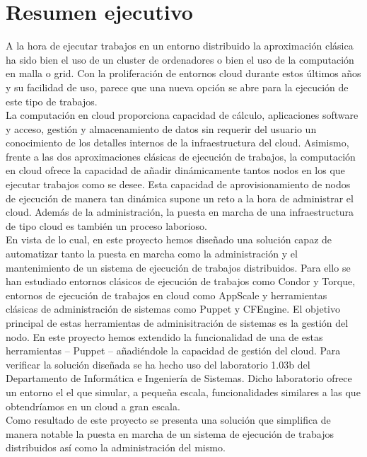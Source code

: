 \chapter{Resumen ejecutivo}
\label{cap:resumen}


A la hora de ejecutar trabajos en un entorno distribuido la aproximación clásica ha sido bien el uso de un cluster de ordenadores o bien el uso de la computación en malla o grid. Con la proliferación de entornos cloud durante estos últimos años y su facilidad de uso, parece que una nueva opción se abre para la ejecución de este tipo de trabajos.\\

La computación en cloud proporciona capacidad de cálculo, aplicaciones software y acceso, gestión y almacenamiento de datos sin requerir del usuario un conocimiento de los detalles internos de la infraestructura del cloud. Asimismo, frente a las dos aproximaciones clásicas de ejecución de trabajos, la computación en cloud ofrece la capacidad de añadir dinámicamente tantos nodos en los que ejecutar trabajos como se desee. Esta capacidad de aprovisionamiento de nodos de ejecución de manera tan dinámica supone un reto a la hora de administrar el cloud. Además de la administración, la puesta en marcha de una infraestructura de tipo cloud es también un proceso laborioso.\\

En vista de lo cual, en este proyecto hemos diseñado una solución capaz de automatizar tanto la puesta en marcha como la administración y el mantenimiento de un sistema de ejecución de trabajos distribuidos. Para ello se han estudiado entornos clásicos de ejecución de trabajos como Condor y Torque, entornos de ejecución de trabajos en cloud como AppScale y herramientas clásicas de administración de sistemas como Puppet y CFEngine. El objetivo principal de estas herramientas de adminisitración de sistemas es la gestión del nodo. En este proyecto hemos extendido la funcionalidad de una de estas herramientas -- Puppet -- añadiéndole la capacidad de gestión del cloud. Para verificar la solución diseñada se ha hecho uso del laboratorio 1.03b del Departamento de Informática e Ingeniería de Sistemas. Dicho laboratorio ofrece un entorno el el que simular, a pequeña escala, funcionalidades similares a las que obtendríamos en un cloud a gran escala.\\

Como resultado de este proyecto se presenta una solución que simplifica de manera notable la puesta en marcha de un sistema de ejecución de trabajos distribuidos así como la administración del mismo.
